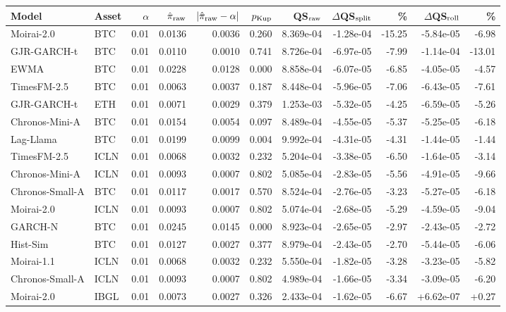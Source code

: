 \begin{tabular}{llrrrrrrrrr}
\toprule
Model & Asset & $\alpha$ & $\hat\pi_{\rm raw}$ & $|\hat\pi_{\rm raw}-\alpha|$ & $p_{\rm Kup}$ & QS$_{\rm raw}$ & $\Delta$QS$_{\rm split}$ & \% & $\Delta$QS$_{\rm roll}$ & \% \\
\midrule
Moirai-2.0 & BTC & 0.01 & 0.0136 & 0.0036 & 0.260 & 8.369e-04 & -1.28e-04 & -15.25 & -5.84e-05 & -6.98 \\
GJR-GARCH-t & BTC & 0.01 & 0.0110 & 0.0010 & 0.741 & 8.726e-04 & -6.97e-05 & -7.99 & -1.14e-04 & -13.01 \\
EWMA & BTC & 0.01 & 0.0228 & 0.0128 & 0.000 & 8.858e-04 & -6.07e-05 & -6.85 & -4.05e-05 & -4.57 \\
TimesFM-2.5 & BTC & 0.01 & 0.0063 & 0.0037 & 0.187 & 8.448e-04 & -5.96e-05 & -7.06 & -6.43e-05 & -7.61 \\
GJR-GARCH-t & ETH & 0.01 & 0.0071 & 0.0029 & 0.379 & 1.253e-03 & -5.32e-05 & -4.25 & -6.59e-05 & -5.26 \\
Chronos-Mini-A & BTC & 0.01 & 0.0154 & 0.0054 & 0.097 & 8.489e-04 & -4.55e-05 & -5.37 & -5.25e-05 & -6.18 \\
Lag-Llama & BTC & 0.01 & 0.0199 & 0.0099 & 0.004 & 9.992e-04 & -4.31e-05 & -4.31 & -1.44e-05 & -1.44 \\
TimesFM-2.5 & ICLN & 0.01 & 0.0068 & 0.0032 & 0.232 & 5.204e-04 & -3.38e-05 & -6.50 & -1.64e-05 & -3.14 \\
Chronos-Mini-A & ICLN & 0.01 & 0.0093 & 0.0007 & 0.802 & 5.085e-04 & -2.83e-05 & -5.56 & -4.91e-05 & -9.66 \\
Chronos-Small-A & BTC & 0.01 & 0.0117 & 0.0017 & 0.570 & 8.524e-04 & -2.76e-05 & -3.23 & -5.27e-05 & -6.18 \\
Moirai-2.0 & ICLN & 0.01 & 0.0093 & 0.0007 & 0.802 & 5.074e-04 & -2.68e-05 & -5.29 & -4.59e-05 & -9.04 \\
GARCH-N & BTC & 0.01 & 0.0245 & 0.0145 & 0.000 & 8.923e-04 & -2.65e-05 & -2.97 & -2.43e-05 & -2.72 \\
Hist-Sim & BTC & 0.01 & 0.0127 & 0.0027 & 0.377 & 8.979e-04 & -2.43e-05 & -2.70 & -5.44e-05 & -6.06 \\
Moirai-1.1 & ICLN & 0.01 & 0.0068 & 0.0032 & 0.232 & 5.550e-04 & -1.82e-05 & -3.28 & -3.23e-05 & -5.82 \\
Chronos-Small-A & ICLN & 0.01 & 0.0093 & 0.0007 & 0.802 & 4.989e-04 & -1.66e-05 & -3.34 & -3.09e-05 & -6.20 \\
Moirai-2.0 & IBGL & 0.01 & 0.0073 & 0.0027 & 0.326 & 2.433e-04 & -1.62e-05 & -6.67 & +6.62e-07 & +0.27 \\

\end{tabular}
